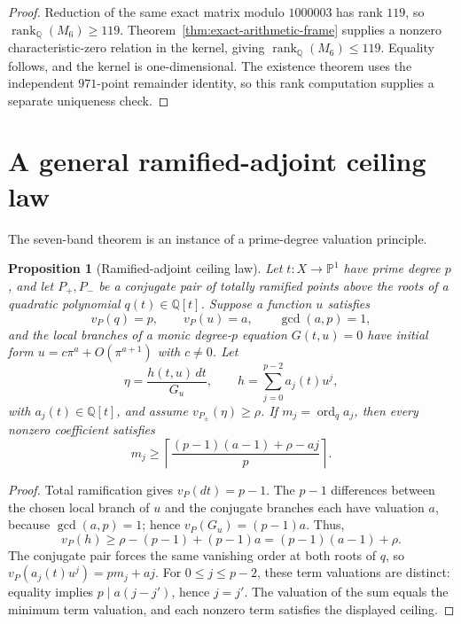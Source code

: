 \documentclass[11pt]{article}
\newtheorem{proposition}[theorem]{Proposition}
\newcommand{\Q}{\mathbb Q}
\newcommand{\PP}{\mathbb P}
\begin{document}
\begin{proof}
Reduction of the same exact matrix modulo $1000003$ has rank $119$, so $\operatorname{rank}_{\Q}(M_6)\ge119$.  Theorem~\ref{thm:exact-arithmetic-frame} supplies a nonzero characteristic-zero relation in the kernel, giving $\operatorname{rank}_{\Q}(M_6)\le119$.  Equality follows, and the kernel is one-dimensional.  The existence theorem uses the independent $971$-point remainder identity, so this rank computation supplies a separate uniqueness check.
\end{proof}



\section{A general ramified-adjoint ceiling law}\label{sec:general-ceiling}
The seven-band theorem is an instance of a prime-degree valuation principle.

\begin{proposition}[Ramified-adjoint ceiling law]\label{prop:general-ceiling}
Let $t:X\to\PP^1$ have prime degree $p$, and let $P_+,P_-$ be a conjugate pair of totally ramified points above the roots of a quadratic polynomial $q(t)\in\Q[t]$.  Suppose a function $u$ satisfies
\[
v_P(q)=p,\qquad v_P(u)=a,\qquad \gcd(a,p)=1,
\]
and the local branches of a monic degree-$p$ equation $G(t,u)=0$ have initial form $u=c\pi^a+O(\pi^{a+1})$ with $c\ne0$.  Let
\[
\eta=\frac{h(t,u)\,dt}{G_u},\qquad h=\sum_{j=0}^{p-2}a_j(t)u^j,
\]
with $a_j(t)\in\Q[t]$, and assume $v_{P_\pm}(\eta)\ge\rho$.  If $m_j=\operatorname{ord}_{q}a_j$, then every nonzero coefficient satisfies
\[
\boxed{\displaystyle m_j\ge\left\lceil\frac{(p-1)(a-1)+\rho-aj}{p}\right\rceil.}
\]
\end{proposition}

\begin{proof}
Total ramification gives $v_P(dt)=p-1$.  The $p-1$ differences between the chosen local branch of $u$ and the conjugate branches each have valuation $a$, because $\gcd(a,p)=1$; hence $v_P(G_u)=(p-1)a$.  Thus,
\[
v_P(h)\ge \rho-(p-1)+(p-1)a=(p-1)(a-1)+\rho.
\]
The conjugate pair forces the same vanishing order at both roots of $q$, so $v_P(a_j(t)u^j)=pm_j+aj$.  For $0\le j\le p-2$, these term valuations are distinct: equality implies $p\mid a(j-j')$, hence $j=j'$.  The valuation of the sum equals the minimum term valuation, and each nonzero term satisfies the displayed ceiling.
\end{proof}
\end{document}
